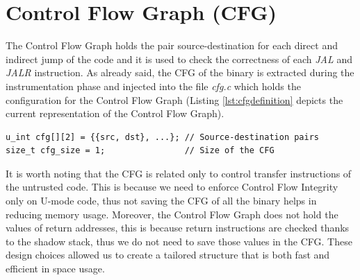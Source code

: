 \section{Control Flow Graph (CFG)}
\label{sec:project_cfg}

The Control Flow Graph holds the pair source-destination for each direct and indirect
jump of the code and it is used to check the correctness of each \textit{JAL}
and \textit{JALR} instruction. As already said, the CFG of the binary is extracted
during the instrumentation phase and injected into the file \textit{cfg.c} which
holds the configuration for the Control Flow Graph (Listing \ref{lst:cfgdefinition}
depicts the current representation of the Control Flow Graph). \\ \begin{lstlisting}[style=CStyle, caption= Definition of the Control Flow Graph inside \textit{cfg.c}, label={lst:cfgdefinition}]
u_int cfg[][2] = {{src, dst}, ...}; // Source-destination pairs
size_t cfg_size = 1;                // Size of the CFG
\end{lstlisting}

It is worth noting that the CFG is related only to control transfer instructions
of the untrusted code. This is because we need to enforce Control Flow Integrity
only on U-mode code, thus not saving the CFG of all the binary helps in reducing
memory usage. Moreover, the Control Flow Graph does not hold the values of
return addresses, this is because return instructions are checked thanks to the shadow
stack, thus we do not need to save those values in the CFG. These design choices
allowed us to create a tailored structure that is both fast and efficient in space
usage.

